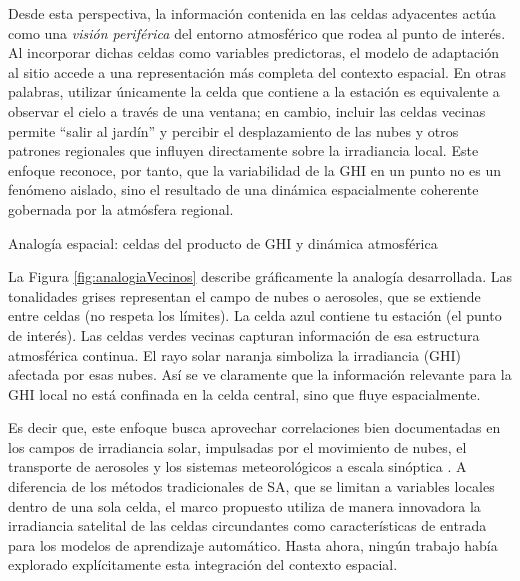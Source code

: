 \documentclass[letterpaper,12pt, twoside]{report}
\providecommand{\DIFdeltex}[1]{{\protect\color{red} \scriptsize #1}} %
\providecommand{\DIFdelFL}[1]{\DIFdel{#1}} %
\providecommand{\DIFdel}[1]{\texorpdfstring{\DIFdeltex{#1}}{}} %
\begin{document}
\DIFdel{Desde esta perspectiva, la información contenida en las celdas adyacentes actúa como una \emph{visión periférica} del entorno atmosférico que rodea al punto de interés. Al incorporar dichas celdas como variables predictoras, el modelo de adaptación al sitio accede a una representación más completa del contexto espacial. En otras palabras, utilizar únicamente la celda que contiene a la estación es equivalente a observar el cielo a través de una ventana; en cambio, incluir las celdas vecinas permite “salir al jardín” y percibir el desplazamiento de las nubes y otros patrones regionales que influyen directamente sobre la irradiancia local. Este enfoque reconoce, por tanto, que la variabilidad de la GHI en un punto no es un fenómeno aislado, sino el resultado de una dinámica espacialmente coherente gobernada por la atmósfera regional.
}%

{%
\DIFdelFL{Analogía espacial: celdas del producto de GHI y dinámica atmosférica}}

\DIFdel{La Figura \ref{fig:analogiaVecinos} describe gráficamente la analogía desarrollada. Las tonalidades grises representan el campo de nubes o aerosoles, que se extiende entre celdas (no respeta los límites). La celda azul contiene tu estación (el punto de interés). Las celdas verdes vecinas capturan información de esa estructura atmosférica continua. El rayo solar naranja simboliza la irradiancia (GHI) afectada por esas nubes. Así se ve claramente que la información relevante para la GHI local no está confinada en la celda central, sino que fluye espacialmente.}%

\DIFdel{Es decir que, este enfoque busca aprovechar correlaciones bien documentadas en los campos de irradiancia solar, impulsadas por el movimiento de nubes, el transporte de aerosoles y los sistemas meteorológicos a escala sinóptica \citep{IHSAN2024}. A diferencia de los métodos tradicionales de SA, que se limitan a variables locales dentro de una sola celda, el marco propuesto utiliza de manera innovadora la irradiancia satelital de las celdas circundantes como características de entrada para los modelos de aprendizaje automático. Hasta ahora, ningún trabajo había explorado explícitamente esta integración del contexto espacial.}%
\end{document}
